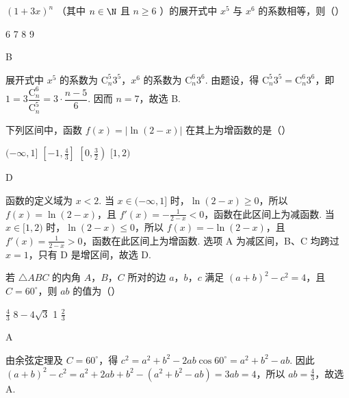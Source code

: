 \begin{problem}
\((1 + 3x)^{n}\) （其中 \(n\in \N\) 且 \(n\geqslant 6\) ）的展开式中 \(x^{5}\) 与 \(x^{6}\) 的系数相等，则（\quad）

\choices
    {6}
    {7}
    {8}
    {9}
\begin{answer}
B
\end{answer}

\begin{solution}
展开式中 \(x^5\) 的系数为 \(\mathrm C_n^5 3^5\)，\(x^6\) 的系数为 \(\mathrm C_n^6 3^6\). 由题设，得
\(\mathrm C_n^5 3^5=\mathrm C_n^6 3^6\)，即
\(1=3\dfrac{\mathrm C_n^6}{\mathrm C_n^5}=3\cdot\dfrac{n-5}{6}\). 因而 \(n=7\)，故选 B.
\end{solution}
\end{problem}

\begin{problem}
下列区间中，函数 \( f(x) = |\ln (2 - x)| \) 在其上为增函数的是（\quad）

\choices
    {\((-\infty, 1]\)}
    {\(\left[-1, \frac{4}{3}\right]\)}
    {\(\left[0, \frac{3}{2}\right)\)}
    {\([1,2)\)}
\begin{answer}
D
\end{answer}

\begin{solution}
函数的定义域为 \(x<2\). 当 \(x\in(-\infty,1]\) 时，\(\ln(2-x)\geqslant0\)，所以 \(f(x)=\ln(2-x)\)，且 \(f'(x)=-\frac{1}{2-x}<0\)，函数在此区间上为减函数. 当 \(x\in[1,2)\) 时，\(\ln(2-x)\leqslant0\)，所以 \(f(x)=-\ln(2-x)\)，且 \(f'(x)=\frac{1}{2-x}>0\)，函数在此区间上为增函数. 选项 A 为减区间，B、C 均跨过 \(x=1\)，只有 D 是增区间，故选 D.
\end{solution}
\end{problem}

\begin{problem}
若 \(\triangle ABC\) 的内角 \(A\)，\(B\)，\(C\) 所对的边 \(a\)，\(b\)，\(c\) 满足 \((a + b)^2 - c^2 = 4\)，且 \(C = 60^\circ\)，则 \(ab\) 的值为（\quad）

\choices
    {\( \frac{4}{3} \)}
    {\(8 - 4\sqrt{3}\)}
    {1}
    {\( \frac{2}{3} \)}
\begin{answer}
A
\end{answer}

\begin{solution}
由余弦定理及 \(C=60^\circ\)，得 \(c^2=a^2+b^2-2ab\cos60^\circ=a^2+b^2-ab\). 因此
\((a+b)^2-c^2=a^2+2ab+b^2-(a^2+b^2-ab)=3ab=4\)，所以 \(ab=\frac{4}{3}\)，故选 A.
\end{solution}
\end{problem}


